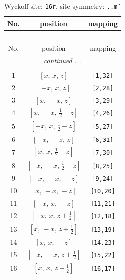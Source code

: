 \documentclass[fleqn,8pt]{jsarticle}
\begin{document}
\renewcommand{\arraystretch}{1.2}
\begin{longtable}{ccc}
\caption{Wyckoff site: {\tt 16r}, site symmetry: {\tt ..m'}}
 \\
 \hline \hline
No. & position & mapping \\ \hline \endfirsthead

\multicolumn{2}{l}{\tablename\ \thetable{}} \\
 \hline \hline
No. & position & mapping \\ \hline \endhead

 \hline \hline
\multicolumn{2}{r}{\footnotesize\it continued ...} \\ \endfoot

 \hline \hline
\multicolumn{2}{r}{} \\ \endlastfoot

1 & $\left[ x,\, x,\, z \right]$ & {\tt [1,32]} \\ \hline
2 & $\left[ - x,\, x,\, z \right]$ & {\tt [2,28]} \\ \hline
3 & $\left[ x,\, - x,\, z \right]$ & {\tt [3,29]} \\ \hline
4 & $\left[ x,\, - x,\, \frac{1}{2} - z \right]$ & {\tt [4,26]} \\ \hline
5 & $\left[ - x,\, x,\, \frac{1}{2} - z \right]$ & {\tt [5,27]} \\ \hline
6 & $\left[ - x,\, - x,\, z \right]$ & {\tt [6,31]} \\ \hline
7 & $\left[ x,\, x,\, \frac{1}{2} - z \right]$ & {\tt [7,30]} \\ \hline
8 & $\left[ - x,\, - x,\, \frac{1}{2} - z \right]$ & {\tt [8,25]} \\ \hline
9 & $\left[ - x,\, - x,\, - z \right]$ & {\tt [9,24]} \\ \hline
10 & $\left[ x,\, - x,\, - z \right]$ & {\tt [10,20]} \\ \hline
11 & $\left[ - x,\, x,\, - z \right]$ & {\tt [11,21]} \\ \hline
12 & $\left[ - x,\, x,\, z + \frac{1}{2} \right]$ & {\tt [12,18]} \\ \hline
13 & $\left[ x,\, - x,\, z + \frac{1}{2} \right]$ & {\tt [13,19]} \\ \hline
14 & $\left[ x,\, x,\, - z \right]$ & {\tt [14,23]} \\ \hline
15 & $\left[ - x,\, - x,\, z + \frac{1}{2} \right]$ & {\tt [15,22]} \\ \hline
16 & $\left[ x,\, x,\, z + \frac{1}{2} \right]$ & {\tt [16,17]} \\
\end{longtable}
\end{document}
